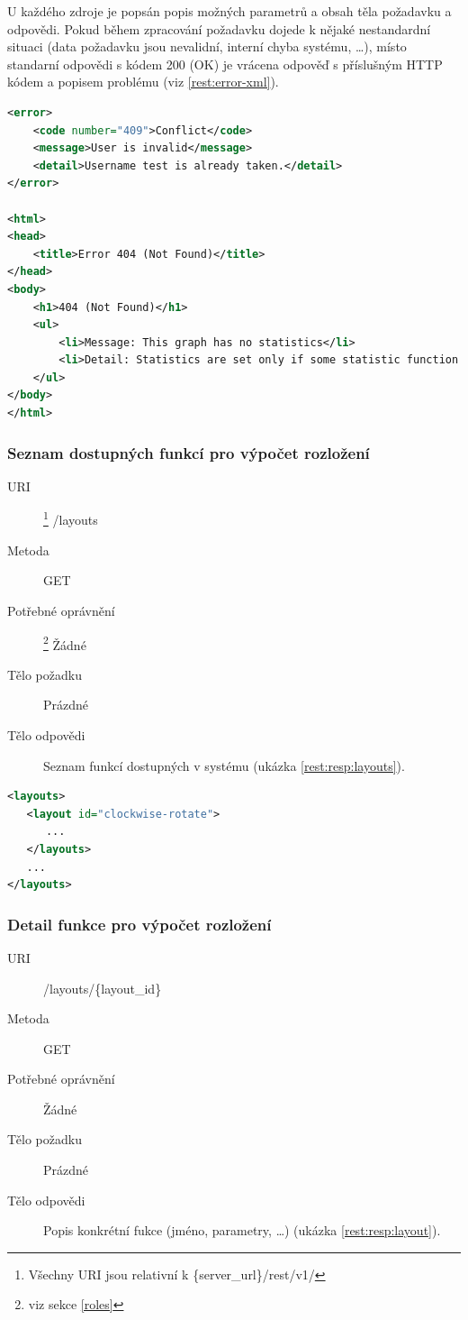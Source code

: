 \documentclass[thesis=M,czech]{FITthesis}[2014/05/6]
\begin{document}
U každého zdroje je popsán popis možných parametrů a obsah těla požadavku a odpovědi. Pokud během zpracování požadavku
dojede k nějaké nestandardní situaci (data požadavku jsou nevalidní, interní chyba systému, \ldots), místo standarní 
odpovědi s kódem 200 (OK) je vrácena odpověď s příslušným HTTP kódem a popisem problému (viz \ref{rest:error-xml}).

\begin{lstlisting}[caption=XML a HTML chybová odpověď, label=rest:error-xml, language=xml]
<error>
    <code number="409">Conflict</code>
    <message>User is invalid</message>
    <detail>Username test is already taken.</detail>
</error>

<html>
<head>
    <title>Error 404 (Not Found)</title>
</head>
<body>
    <h1>404 (Not Found)</h1>
    <ul>
        <li>Message: This graph has no statistics</li>
        <li>Detail: Statistics are set only if some statistic function was applied previously</li>
    </ul>
</body>
</html>
\end{lstlisting}


\subsubsection{Seznam dostupných funkcí pro výpočet rozložení}
\begin{description}
  \item[URI]\footnote{Všechny URI jsou relativní k \{server\_url\}/rest/v1/} /layouts
  \item[Metoda] GET
  \item[Potřebné oprávnění]\footnote{viz sekce \ref{roles}} Žádné
  \item[Tělo požadku] Prázdné
  \item[Tělo odpovědi] Seznam  funkcí dostupných v systému (ukázka \ref{rest:resp:layouts}).
\end{description}

\begin{lstlisting}[caption=Tělo odpovědi zdroje /layouts (GET), label=rest:resp:layouts, language=xml]
<layouts>
   <layout id="clockwise-rotate">
      ...
   </layouts>
   ...
</layouts>
\end{lstlisting}  

\subsubsection{Detail funkce pro výpočet rozložení}
\begin{description}
  \item[URI] /layouts/\{layout\_id\}
  \item[Metoda] GET
  \item[Potřebné oprávnění] Žádné
  \item[Tělo požadku] Prázdné
  \item[Tělo odpovědi] Popis konkrétní fukce (jméno, parametry, \ldots) (ukázka \ref{rest:resp:layout}).
\end{description}
\end{document}

